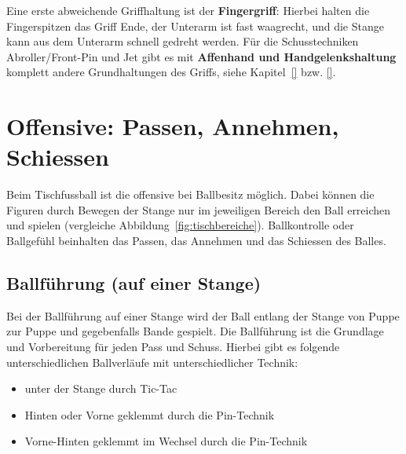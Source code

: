 Eine erste abweichende Griffhaltung ist der \textbf{Fingergriff}: Hierbei halten die Fingerspitzen das Griff Ende, der Unterarm ist fast waagrecht, und die Stange kann aus dem Unterarm schnell gedreht werden.
Für die Schusstechniken Abroller/Front-Pin und Jet gibt es mit \textbf{Affenhand und Handgelenkshaltung} komplett andere Grundhaltungen des Griffs, siehe Kapitel~\ref{} bzw. \ref{}.


\section{Offensive: Passen, Annehmen, Schiessen}
\label{technik:offensive}

Beim Tischfussball ist die \gls{offensive} bei Ballbesitz möglich.
Dabei können die Figuren durch Bewegen der Stange nur im jeweiligen Bereich den Ball erreichen und spielen (vergleiche Abbildung~\ref{fig:tischbereiche}).
Ballkontrolle oder Ballgefühl beinhalten das Passen, das Annehmen und das Schiessen des Balles.

\subsection{Ballführung (auf einer Stange)} 
\label{technik:offensive:eine}

Bei der Ballführung auf einer Stange wird der Ball entlang der Stange von Puppe zur Puppe und gegebenfalls Bande gespielt. 
Die Ballführung ist die Grundlage und Vorbereitung für jeden Pass und Schuss.
Hierbei gibt es folgende unterschiedlichen Ballverläufe mit unterschiedlicher Technik:
\begin{itemize}
    \item unter der Stange durch Tic-Tac
    \item Hinten oder Vorne geklemmt durch die Pin-Technik
    \item Vorne-Hinten geklemmt im Wechsel durch die Pin-Technik
\end{itemize}


